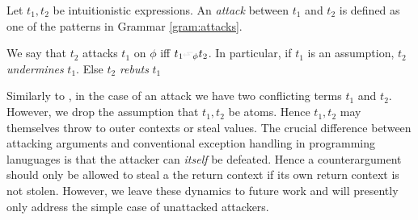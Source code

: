 \documentclass{IOS-Book-Article}
\begin{document}
  \begin{definition}[Attack]
    Let $t_1,t_2$ be intuitionistic \matilda expressions. An \emph{attack} between $t_1$ and $t_2$ is defined as one of the patterns in Grammar \ref{gram:attacks}.

    \begin{grammar}
    \end{grammar}

    We say that $t_2$ attacks $t_1$ on $\phi$ iff $t_1\leftattack_\phi t_2$. In particular, if $t_1$ is an assumption, $t_2$ \emph{undermines} $t_1$. Else $t_2$ \emph{rebuts} $t_1$
  \end{definition}
  Similarly to , in the case of an attack we have two conflicting terms $t_1$ and $t_2$. However, we drop the assumption that $t_1, t_2$ be atoms. Hence $t_1,t_2$ may themselves throw to outer contexts or steal values.
  The crucial difference between attacking arguments and conventional exception handling in programming lanuguages is that the attacker can \emph{itself} be defeated.
  Hence a counterargument should only be allowed to steal a the return context if its own return context is not stolen.
  However, we leave these dynamics to future work and will presently only address the simple case of unattacked attackers.
  
\end{document}
